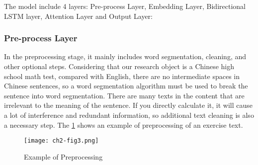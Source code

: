 The model include 4 layers: Pre-process Layer, Embedding Layer, Bidirectional LSTM layer, Attention Layer and Output Layer:
\subsubsection{Pre-process Layer}




In the preprocessing stage, it mainly includes word segmentation, cleaning, and other optional steps. Considering that our research object is a Chinese high school math test, compared with English, there are no intermediate spaces in Chinese sentences, so a word segmentation algorithm must be used to break the sentence into word segmentation. There are many texts in the content that are irrelevant to the meaning of the sentence. If you directly calculate it, it will cause a lot of interference and redundant information, so additional text cleaning is also a necessary step. The \figurename{\ref{ch2-fig3}} shows an example of preprocessing of an exercise text.

\begin{figure}[htbp!]
	\centering
	\texttt{[image: ch2-fig3.png]}
	\caption{Example of Preprocessing}\label{ch2-fig3}
\end{figure}


